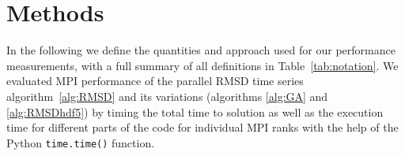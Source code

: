 
\section{Methods}
\label{sec:methods}


In the following we define the quantities and approach used for our performance measurements, with a full summary of all definitions in Table~\ref{tab:notation}.
We evaluated MPI performance of the parallel RMSD time series algorithm~\ref{alg:RMSD} and its variations (algorithms \ref{alg:GA} and \ref{alg:RMSDhdf5}) by timing the total time to solution as well as the execution time for different parts of the code for individual MPI ranks with the help of the Python \texttt{time.time()} function.


